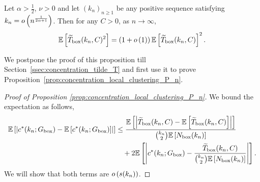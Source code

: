\begin{proposition}\label{prop:concentration_tilde_T_P_n}
Let $\alpha > \frac{1}{2}$, $\nu > 0$ and let $(k_n)_{n \ge 1}$ be any positive sequence satisfying $k_n = o\left(n^{\frac{1}{2\alpha+1}}\right)$. Then for any $C > 0$, as $n \to \infty$,
\[
	\mathbb{E}\left[\widetilde{T}_{\text{box}}(k_n,C)^2\right] = \left(1 + o\left(1\right)\right)\mathbb{E}\left[\widetilde{T}_{\text{box}}(k_n, C)\right]^2.
\]
\end{proposition}

We postpone the proof of this proposition till Section~\ref{ssec:concentration_tilde_T} and first use it to prove Proposition~\ref{prop:concentration_local_clustering_P_n}. 

\begin{proof}[Proof of Proposition \ref{prop:concentration_local_clustering_P_n}]
We bound the expectation as follows,
\begin{align*}
	\mathbb{E}\left[\left|c^\ast(k_n; G_{\text{box}}) - \mathbb{E}\left[c^\ast(k_n; G_{\text{box}})\right]\right|\right] 
	&\le \frac{\mathbb{E}\left[\left|\widetilde{T}_{\text{box}}(k_n,C) - \mathbb{E}\left[\widetilde{T}_{\text{box}}(k_n,C)\right]\right|\right]}
		{\binom{k_n}{2}\mathbb{E}\left[N_{\text{box}}(k_n)\right]}\\
	&\hspace{10pt} + 2 \mathbb{E}\left[\left|c^\ast(k_n; G_{\text{box}}) - \frac{\widetilde{T}_{\text{box}}(k_n,C)}{\binom{k_n}{2}\mathbb{E}\left[N_{\text{box}}(k_n)\right]}\right|\right].
\end{align*}
We will show that both terms are $o\left(s(k_n)\right)$.


\end{proof}
